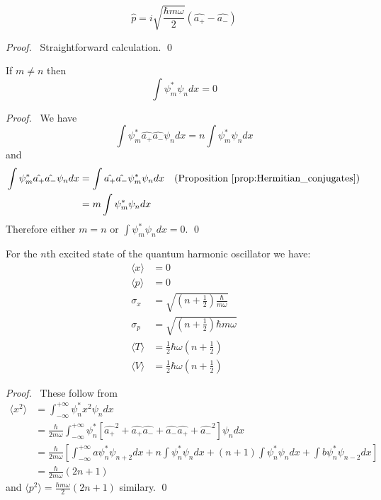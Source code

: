 \begin{prop}
\[ \hat{p} = i \sqrt{\frac{\hbar m \omega}{2}} (\hat{a_+} - \hat{a_-}) \]
\end{prop}

\begin{proof}
\pf\ Straightforward calculation. \qed
\end{proof}

\begin{prop}
If $m \neq n$ then
\[ \int \psi_m^* \psi_n dx = 0 \]
\end{prop}

\begin{proof}
\pf\ We have
\[ \int \psi_m^* \hat{a_+} \hat{a_-} \psi_n dx = n \int \psi_m^* \psi_n dx \]
and
\begin{align*}
\int \psi_m^* \hat{a_+} \hat{a_-} \psi_n dx & = \int \hat{a_+} \hat{a_-} \psi_m^* \psi_n dx & (\text{Proposition \ref{prop:Hermitian_conjugates}}) \\
& = m \int \psi_m^* \psi_n dx
\end{align*}
Therefore either $m = n$ or $\int \psi_m^* \psi_n dx = 0$. \qed
\end{proof}

\begin{prop}
For the $n$th excited state of the quantum harmonic oscillator we have:
\begin{align*}
\langle x \rangle & = 0 \\
\langle p \rangle & = 0 \\
\sigma_x & = \sqrt{\left( n + \frac{1}{2} \right) \frac{\hbar}{m \omega}} \\
\sigma_p & = \sqrt{\left( n + \frac{1}{2} \right) \hbar m \omega} \\
\langle T \rangle & = \frac{1}{2} \hbar \omega \left( n + \frac{1}{2} \right) \\
\langle V \rangle & = \frac{1}{2} \hbar \omega \left( n + \frac{1}{2} \right)
\end{align*}
\end{prop}

\begin{proof}
\pf\ These follow from
\begin{align*}
\langle x^2 \rangle & = \int_{-\infty}^{+ \infty} \psi_n^* x^2 \psi_n dx \\
& = \frac{\hbar}{2 m \omega} \int_{-\infty}^{+ \infty} \psi_n^* [ \hat{a_+}^2 + \hat{a_+} \hat{a_-} + \hat{a_-} \hat{a_+} + \hat{a_-}^2 ] \psi_n dx \\
& = \frac{\hbar}{2 m \omega} \left[ \int_{- \infty}^{+ \infty} a \psi_n^* \psi_{n+2} dx + n \int \psi_n^* \psi_n dx + (n+1) \int \psi_n^* \psi_n dx + \int b \psi_n^* \psi_{n-2} dx \right] \\
& = \frac{\hbar}{2 m \omega} (2n+1)
\end{align*}
and $\langle p^2 \rangle = \frac{\hbar m \omega}{2} (2n+1)$ similary. \qed
\end{proof}

